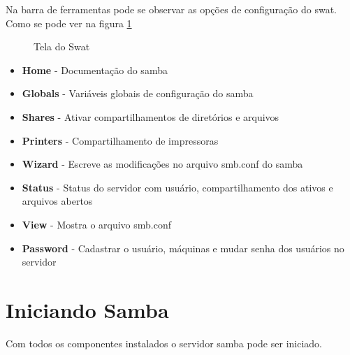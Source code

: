 Na barra de ferramentas pode se observar as opções de configuração do swat. Como se pode ver na figura \ref{swat}

\begin{figure}[ht]
   	\centering
   	\caption{Tela do Swat}
    \label{swat}
\end{figure}

\begin{itemize}
    \item \textbf{Home} - Documentação do samba
    \item \textbf{Globals} - Variáveis globais de configuração do samba
    \item \textbf{Shares} - Ativar compartilhamentos de diretórios e arquivos
    \item \textbf{Printers} - Compartilhamento de impressoras
    \item \textbf{Wizard} - Escreve as modificações no arquivo smb.conf do samba
    \item \textbf{Status} - Status do servidor com usuário, compartilhamento dos ativos e arquivos abertos
    \item \textbf{View} - Mostra o arquivo smb.conf
    \item \textbf{Password} - Cadastrar o usuário, máquinas e mudar senha dos usuários no servidor
\end{itemize}

\section{Iniciando Samba}

Com todos os componentes instalados o servidor samba pode ser iniciado.

